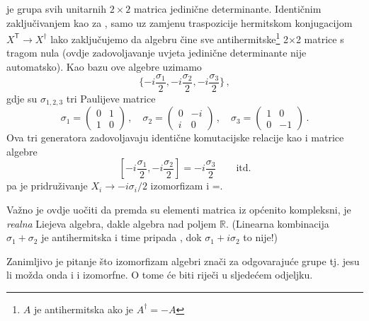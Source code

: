 \begin{primjer} \label{pr:su2so3Alg}
     je grupa svih unitarnih $2\times 2$ matrica jedinične determinante.
    Identičnim zaključivanjem kao za , samo uz zamjenu traspozicije
    hermitskom konjugacijom $X^\mathsf{T} \to X^\mathsf{\dagger}$ lako
    zaključujemo da algebru  čine sve
    antihermitske\footnote{$A$ je antihermitska ako je $A^\dagger=-A$} 
    2$\times$2 matrice s tragom nula (ovdje zadovoljavanje uvjeta jedinične
    determinante nije automatsko). Kao bazu ove algebre uzimamo
\begin{equation}
     \{ -i\frac{\sigma_1}{2},  -i\frac{\sigma_2}{2},  -i\frac{\sigma_3}{2} \} \,,
\end{equation}
gdje su $\sigma_{1,2,3}$ tri Paulijeve matrice
\begin{equation}
\sigma_1=\left( \begin{array}{cc} 0 &  1 \\ 1 & 0 \end{array} \right) \,,
\quad
\sigma_2=\left( \begin{array}{cc} 0 & -i \\ i & 0 \end{array} \right) \,,
\quad
\sigma_3=\left( \begin{array}{cc} 1 &  0 \\ 0 &-1 \end{array} \right) \,.
\label{eq:PaulijeveMatrice}
\end{equation}
Ova tri generatora zadovoljavaju identične komutacijske relacije kao i matrice
 algebre
\begin{displaymath}
 \left[ -i\frac{\sigma_1}{2}, -i\frac{\sigma_2}{2} \right] =
 -i\frac{\sigma_3}{2} \qquad \text{itd.}
\end{displaymath}
pa je pridruživanje $X_i \to -i \sigma_i/2$  izomorfizam i
=.

Važno je ovdje uočiti da premda su elementi matrica iz  općenito kompleksni,
 je \emph{realna} Liejeva algebra, dakle algebra nad poljem $\mathbb{R}$. 
(Linearna kombinacija $\sigma_1 + \sigma_2$ je antihermitska i time pripada ,
dok $\sigma_1 + i \sigma_2$ to nije!)

Zanimljivo je pitanje što izomorfizam algebri znači za odgovarajuće grupe tj.
jesu li možda onda i  i  izomorfne. O tome će biti riječi u sljedećem odjeljku.
\end{primjer}

